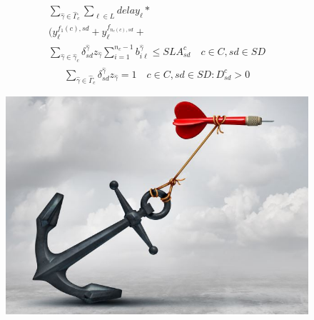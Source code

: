 \documentclass{beamer}
\begin{document}
\begin{frame}
	\begin{equation}
	\begin{split}
	\sum_{\hat{\gamma} \in \hat{\Gamma}_c}\sum_{\ell \in L}delay_\ell*\\
	(y_\ell^{f_1(c),sd}+y_\ell^{f_{n_c(c),sd}}+\\
	\sum_{\hat{\gamma} \in \hat{\gamma}_c}\delta_{sd}^{\hat{\gamma}}z_{\hat{\gamma}}\sum_{i=1}^{n_c-1}b_{i\ell}^{\hat{\gamma}}\leq SLA_{sd}^c \quad c \in C , sd \in SD
	\end{split}
	\end{equation}
		\begin{equation}
	\begin{split}
	\sum_{\hat{\gamma} \in \hat{\Gamma}_c}\delta_{sd}^{\hat{\gamma}}z_{\hat{\gamma}}=1\quad c \in C , sd \in SD:D_{sd}^c>0
	\end{split}
	\end{equation}
	
\begin{figure}
	\centering
	\includegraphics[width=0.3\linewidth]{constraints3}
	\label{fig:constraints3}
\end{figure}
\end{frame}
\end{document}
